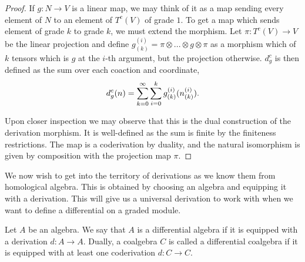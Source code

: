 \documentclass[../thesis.tex]{subfiles}
\begin{document}
\begin{proof}
                If $g: N \rightarrow V$ is a linear map, we may think of it as a map sending every element of $N$ to an element of $T^c(V)$ of grade $1$. To get a map which sends element of grade $k$ to grade $k$, we must extend the morphism. Let $\pi : T^c(V) \rightarrow V$ be the linear projection and define $g_{(k)}^{(i)} = \pi\otimes ... \otimes g \otimes \pi$ as a morphism which of $k$ tensors which is $g$ at the $i$-th argument, but the projection otherwise. $d_g^c$ is then defined as the sum over each coaction and coordinate,
                \begin{align*}
                    d_g^c(n) = \sum_{k=0}^\infty \sum_{i=0}^k g_{(k)}^{(i)}(n_{(k)}^{(i)})\tt{.}
                \end{align*}
                
                Upon closer inspection we may observe that this is the dual construction of the derivation morphism. It is well-defined as the sum is finite by the finiteness restrictions. The map is a coderivation by duality, and the natural isomorphism is given by composition with the projection map $\pi$.
            \end{proof}

            We now wish to get into the territory of derivations as we know them from homological algebra. This is obtained by choosing an algebra and equipping it with a derivation. This will give us a universal derivation to work with when we want to define a differential on a graded module.

            \begin{definition}
                Let $A$ be an algebra. We say that $A$ is a differential algebra if it is equipped with a derivation $d:A\rightarrow A$. Dually, a coalgebra $C$ is called a differential coalgebra if it is equipped with at least one coderivation $d:C\rightarrow C$.
            \end{definition}
\end{document}
